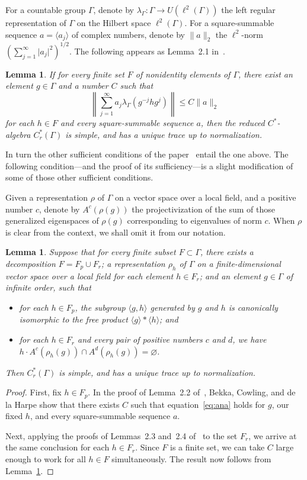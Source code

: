 \documentclass{amsart}
\theoremstyle{plain}
\newtheorem{lemma}[theorem]{Lemma}
\theoremstyle{definition}
\theoremstyle{remark}
\providecommand{\abs}[1]{\lvert#1\rvert}
\providecommand{\norm}[1]{\lVert#1\rVert}
\begin{document}
For a countable group $\Gamma$, denote by $\lambda_{\Gamma}: \Gamma \to U(\ell^{2}(\Gamma))$
the left regular representation of $\Gamma$ on the Hilbert space $\ell^{2}(\Gamma)$.
For a square-summable sequence $a = \langle a_{j} \rangle$ of complex numbers, denote by
$\norm{a}_{2}$ the $\ell^{2}$-norm $(\sum_{j = 1}^{\infty} \abs{a_{j}}^{2})^{1/2}$.
The following appears as Lemma~2.1 in~\cite{MR96a:22020}.
\begin{lemma}\label{lem:BCDPana}
If for every finite set $F$ of nonidentity elements
of $\Gamma$, there exist an element $g \in \Gamma$ and a number $C$ such that
\begin{equation}\label{eq:ana}
\left\lVert\sum_{j = 1}^{\infty} a_{j} \lambda_{\Gamma}(g^{-j}hg^{j})\right\rVert
\leqslant C
\norm{a}_{2}
\end{equation}
for each $h \in F$ and every square-summable sequence $a$, then the
reduced $C^{*}$-algebra $C_{r}^{*}(\Gamma)$ is simple, and has a unique trace up to
normalization.
\end{lemma}
In turn the other sufficient conditions of the paper~\cite{MR96a:22020} entail the one
above. The following condition---and the proof of its sufficiency---is a slight
modification of some of those other sufficient conditions.

Given a representation $\rho$ of $\Gamma$ on a vector space over a local field, and a
positive number $c$, denote
by $A^{c}(\rho(g))$ the projectivization of the sum of those generalized eigenspaces of
$\rho(g)$ corresponding to eigenvalues of norm $c$. When $\rho$ is clear from the
context, we shall omit it from our notation.
\begin{lemma}\label{lem:modifiedBCD}
Suppose that for every finite subset $F \subset \Gamma$, there
exists a decomposition $F = F_{p} \cup F_{r}$; a
representation $\rho_{h}$ of $\Gamma$ on a finite-dimensional vector space over a local
field for each element $h \in F_{r}$; and an element $g \in \Gamma$ of infinite order,
such that
\begin{itemize}
\item[(i)] for each $h \in F_{p}$, the subgroup $\langle g, h \rangle$ generated by $g$ and
$h$ is canonically isomorphic to the free product $\langle g \rangle * \langle h
\rangle$; and
\item[(ii)] for each $h \in F_{r}$ and every pair of positive numbers $c$ and $d$, we have
$h \cdot A^{c}(\rho_{h}(g)) \cap A^{d}(\rho_{h}(g)) = \varnothing$.
\end{itemize}
Then $C_{r}^{*}(\Gamma)$ is simple, and has a unique trace up to normalization.
\end{lemma}
\begin{proof}
First, fix $h \in F_{p}$. In the proof of Lemma~2.2 of~\cite{MR96a:22020}, Bekka,
Cowling, and de la Harpe show that there exists $C$ such that
equation~\eqref{eq:ana} holds for $g$, our fixed $h$, and every square-summable sequence
$a$.

Next, applying the proofs of Lemmas~2.3 and~2.4 of~\cite{MR96a:22020} to the set $F_{r}$,
we arrive at the same conclusion for each $h \in F_{r}$. Since $F$ is a finite set, we
can take $C$ large enough to work for all $h \in F$ simultaneously. The result now
follows from Lemma~\ref{lem:BCDPana}.
\end{proof}
\end{document}
